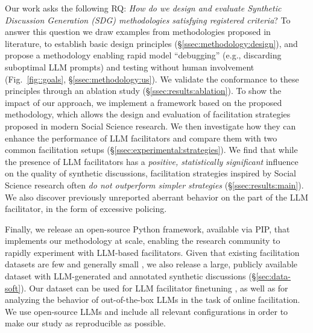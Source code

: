Our work asks the following RQ: \emph{How do we design and evaluate Synthetic Discussion Generation (SDG) methodologies satisfying registered criteria}? To answer this question we draw examples from methodologies proposed in literature, to establish basic design principles (\S\ref{ssec:methodology:design}), and propose a methodology enabling rapid model ``debugging'' (e.g., discarding suboptimal LLM prompts) and testing without human involvement (Fig.~\ref{fig::goals}, \S\ref{ssec:methodology:us}). We validate the conformance to these principles through an ablation study (\S\ref{ssec:results:ablation}). To show the impact of our approach, we implement a framework based on the proposed methodology, which allows the design and evaluation of facilitation strategies proposed in modern Social Science research. We then investigate how they can enhance the performance of LLM facilitators and compare them with two common facilitation setups (\S\ref{ssec:experimental:strategies}). We find that while the presence of LLM facilitators has a \emph{positive, statistically significant} influence on the quality of synthetic discussions, facilitation strategies inspired by Social Science research often \emph{do not outperform simpler strategies} (\S\ref{ssec:results:main}). We also discover previously unreported aberrant behavior on the part of the LLM facilitator, in the form of excessive policing.

Finally, we release an open-source Python framework, available via PIP, that implements our methodology at scale, enabling the research community to rapidly experiment with LLM-based facilitators. Given that existing facilitation datasets are few and generally small \citep{korre2025evaluation}, we also release \vmd a large, publicly available dataset with LLM-generated and annotated synthetic discussions (\S\ref{sec:data-soft}). Our dataset can be used for LLM facilitator finetuning \cite{ulmer2024}, as well as for analyzing the behavior of out-of-the-box LLMs in the task of online facilitation. We use open-source LLMs and include all relevant configurations in order to make our study as reproducible as possible.
